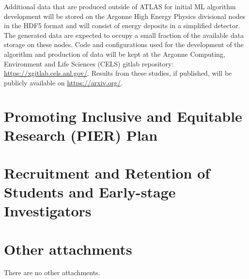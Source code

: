 \documentclass[letter, USenglish, 11pt, subfigure]{article}
\begin{document}
Additional data that are produced outside of ATLAS for initial ML algorithm development will be stored on the Argonne High Energy Physics divisional nodes in the HDF5 format and will consist of energy deposits in a simplified detector. The generated data are expected to occupy a small fraction of the available data storage on these nodes. Code and configurations used for the development of the algorithm and production of data will be kept at the Argonne Computing, Environment and Life Sciences (CELS) gitlab repository: \url{https://xgitlab.cels.anl.gov/}. Results from these studies, if published, will be publicly available on \url{https://arxiv.org/}. 

\clearpage

\section{Promoting Inclusive and Equitable Research (PIER) Plan}

\clearpage

\section{Recruitment and Retention of Students and Early-stage Investigators}

\clearpage

\section{Other attachments}
There are no other attachments.
\end{document}
